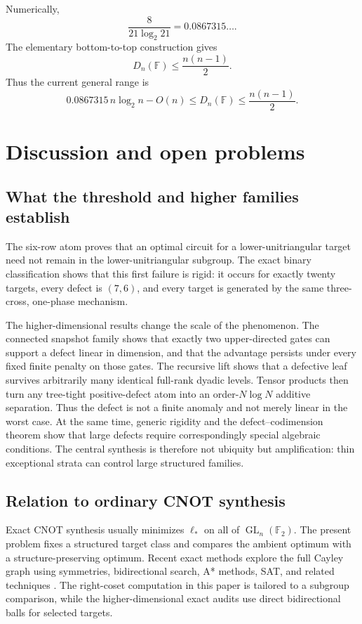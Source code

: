 \documentclass[11pt]{amsart}
\numberwithin{equation}{section}
\theoremstyle{definition}
\theoremstyle{remark}
\newcommand{\F}{\mathbb F}
\newcommand{\GL}{\operatorname{GL}}
\newcommand{\ellAll}{\ell_{*}}
\begin{document}
Numerically,
\[
\frac{8}{21\log_2 21}
=0.0867315\ldots.
\]
The elementary bottom-to-top construction gives
\[
D_n(\F)\le\frac{n(n-1)}2.
\]
Thus the current general range is
\begin{equation}\label{eq:defect-range}
0.0867315\,n\log_2n-O(n)
\le
D_n(\F)
\le
\frac{n(n-1)}2.
\end{equation}

\section{Discussion and open problems}\label{sec:discussion}

\subsection{What the threshold and higher families establish}

The six-row atom proves that an optimal circuit for a lower-unitriangular target need not remain in the lower-unitriangular subgroup.  The exact binary classification shows that this first failure is rigid: it occurs for exactly twenty targets, every defect is $(7,6)$, and every target is generated by the same three-cross, one-phase mechanism.

The higher-dimensional results change the scale of the phenomenon.  The connected snapshot family shows that exactly two upper-directed gates can support a defect linear in dimension, and that the advantage persists under every fixed finite penalty on those gates.  The recursive lift shows that a defective leaf survives arbitrarily many identical full-rank dyadic levels.  Tensor products then turn any tree-tight positive-defect atom into an order-$N\log N$ additive separation.  Thus the defect is not a finite anomaly and not merely linear in the worst case.  At the same time, generic rigidity and the defect--codimension theorem show that large defects require correspondingly special algebraic conditions.  The central synthesis is therefore not ubiquity but amplification: thin exceptional strata can control large structured families.

\subsection{Relation to ordinary CNOT synthesis}

Exact CNOT synthesis usually minimizes $\ellAll$ on all of $\GL_n(\F_2)$.  The present problem fixes a structured target class and compares the ambient optimum with a structure-preserving optimum.  Recent exact methods explore the full Cayley graph using symmetries, bidirectional search, A* methods, SAT, and related techniques \cite{ChristensenEtAl2025,WebsterEtAl2025,ShaikVanDePol2025}.  The right-coset computation in this paper is tailored to a subgroup comparison, while the higher-dimensional exact audits use direct bidirectional balls for selected targets.
\end{document}
